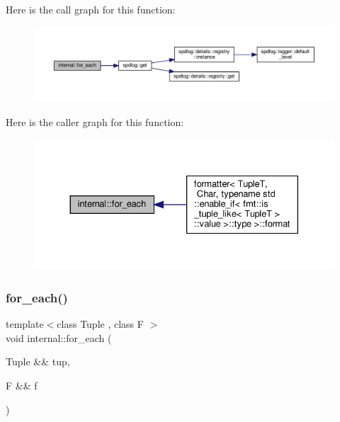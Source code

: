 Here is the call graph for this function\+:
\nopagebreak
\begin{figure}[H]
\begin{center}
\leavevmode
\includegraphics[width=350pt]{namespaceinternal_a135f5624f6539777a653836901ec2e9a_cgraph}
\end{center}
\end{figure}
Here is the caller graph for this function\+:
\nopagebreak
\begin{figure}[H]
\begin{center}
\leavevmode
\includegraphics[width=330pt]{namespaceinternal_a135f5624f6539777a653836901ec2e9a_icgraph}
\end{center}
\end{figure}
\mbox{\label{namespaceinternal_ad176bd254de2376b5b51d2aa8fbffed6}} 
\subsubsection{\texorpdfstring{for\+\_\+each()}{for\_each()}\hspace{0.1cm}{\footnotesize\ttfamily [2/2]}}
{\footnotesize\ttfamily template$<$class Tuple , class F $>$ \\
void internal\+::for\+\_\+each (\begin{DoxyParamCaption}\item[{Tuple \&\&}]{tup,  }\item[{F \&\&}]{f }\end{DoxyParamCaption})}



